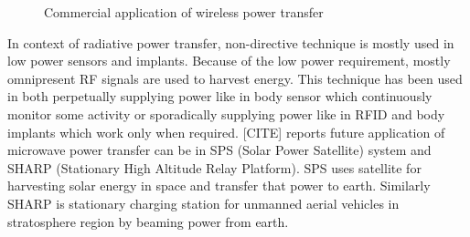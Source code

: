 \documentclass[12pt,a4paper,UKenglish]{article}
\begin{document}
\begin{figure} [!htbp]
  \begin{minipage}{\linewidth}
  \centering 
  \hfill
 \hfill
 \end{minipage}\par\medskip
 \centering
 \caption{Commercial application of wireless power transfer} 
\label{wpt_application} 
\end{figure}


In context of radiative power transfer, non-directive technique is mostly used in low power sensors and implants. 
Because of the low power requirement, mostly omnipresent RF signals are used to harvest energy. This technique 
has been used in both perpetually supplying power like in body sensor which continuously monitor some activity 
or sporadically supplying power like in RFID and body implants which work only when required. [CITE] reports 
future application of microwave power transfer can be in SPS (Solar Power Satellite) system and SHARP (Stationary 
High Altitude Relay Platform). SPS uses satellite for harvesting solar energy in space and transfer that power 
to earth. Similarly SHARP is stationary charging station for unmanned aerial vehicles in stratosphere region by 
beaming power from earth.    \\
\end{document}
